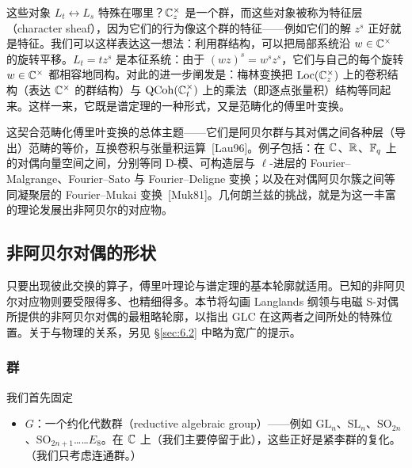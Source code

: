 这些对象 $L_{t}\leftrightarrow L_{s}$ 特殊在哪里？$\mathbb{C}^{\times}_{z}$ 是一个群，而这些对象被称为特征层（character sheaf），因为它们的行为像这个群的特征——例如它们的解 $z^{s}$ 正好就是特征。我们可以这样表达这一想法：利用群结构，可以把局部系统沿 $w\in\mathbb{C}^{\times}$ 的旋转平移。$L_{t}=tz^{s}$ 是本征系统：由于 $(wz)^{s}=w^{s}z^{s}$，它们与自己的每个旋转 $w\in\mathbb{C}^{\times}$ 都相容地同构。对此的进一步阐发是：梅林变换把 $\operatorname{Loc}(\mathbb{C}^{\times}_{z})$ 上的卷积结构（表达 $\mathbb{C}^{\times}$ 的群结构）与 $\operatorname{QCoh}(\mathbb{C}^{\times}_{t})$ 上的乘法（即逐点张量积）结构等同起来。这样一来，它既是谱定理的一种形式，又是范畴化的傅里叶变换。

这契合范畴化傅里叶变换的总体主题——它们是阿贝尔群与其对偶之间各种层（导出）范畴的等价，互换卷积与张量积运算~[Lau96]。例子包括：在 $\mathbb{C}$、$\mathbb{R}$、$\mathbb{F}_{q}$ 上的对偶向量空间之间，分别等同 D-模、可构造层与 $\ell$-进层的 Fourier–Malgrange、Fourier–Sato 与 Fourier–Deligne 变换；以及在对偶阿贝尔簇之间等同凝聚层的 Fourier–Mukai 变换~[Muk81]。几何朗兰兹的挑战，就是为这一丰富的理论发展出非阿贝尔的对应物。

\subsection{非阿贝尔对偶的形状}\label{sec:1.4}

只要出现彼此交换的算子，傅里叶理论与谱定理的基本轮廓就适用。已知的非阿贝尔对应物则要受限得多、也精细得多。本节将勾画 Langlands 纲领与电磁 S-对偶所提供的非阿贝尔对偶的最粗略轮廓，以指出 GLC 在这两者之间所处的特殊位置。关于与物理的关系，另见 \S\ref{sec:6.2} 中略为宽广的提示。

\subsubsection{群}\label{sec:1.4.1}

我们首先固定

\begin{itemize}
\item $G$：一个约化代数群（reductive algebraic group）——例如 $\mathrm{GL}_{n}$、$\mathrm{SL}_{n}$、$\mathrm{SO}_{2n}$、$\mathrm{SO}_{2n+1}$……$E_{8}$。在 $\mathbb{C}$ 上（我们主要停留于此），这些正好是紧李群的复化。（我们只考虑连通群。）
\end{itemize}

